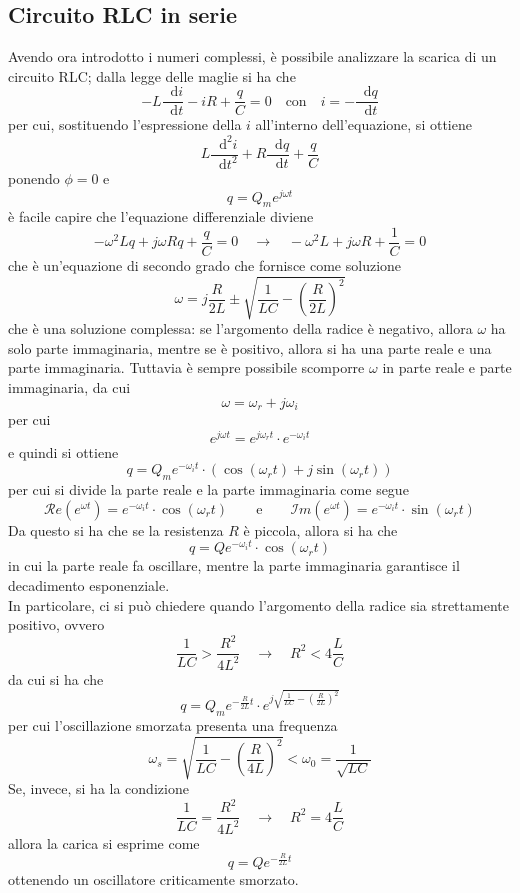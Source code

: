 \documentclass[a4paper]{extarticle}
\newcommand\dif{\mathop{}\!\mathrm{d}}
\begin{document}
\vspace{1em}
\subsection{Circuito RLC in serie}
Avendo ora introdotto i numeri complessi, è possibile analizzare la scarica di un circuito RLC; dalla legge delle maglie si ha che
\[-L \dfrac{\dif i}{\dif t} - i R + \dfrac{q}{C} = 0 \hspace{1em} \text{con} \hspace{1em} i=-\dfrac{\dif q}{\dif t}\]
per cui, sostituendo l'espressione della $i$ all'interno dell'equazione, si ottiene
\[L\dfrac{\dif^2 i}{\dif t^2} + R \dfrac{\dif q}{\dif t} + \dfrac{q}{C}\]
ponendo $\phi=0$ e
\[q=Q_m e^{j \omega t}\]
è facile capire che l'equazione differenziale diviene
\[-\omega^2 L q + j \omega R q + \dfrac{q}{C} = 0 \hspace{1em} \rightarrow \hspace{1em} -\omega^2 L + j\omega R + \dfrac{1}{C} = 0\]
che è un'equazione di secondo grado che fornisce come soluzione
\[\omega=j \dfrac{R}{2L} \pm \sqrt{\dfrac{1}{LC}-\left(\dfrac{R}{2L}\right)^2}\]
che è una soluzione complessa: se l'argomento della radice è negativo, allora $\omega$ ha solo parte immaginaria, mentre se è positivo, allora si ha una parte reale e una parte immaginaria. Tuttavia è sempre possibile scomporre $\omega$ in parte reale e parte immaginaria, da cui
\[\omega=\omega_r + j \omega_i\]
per cui
\[e^{j \omega t} = e^{j \omega_r t} \cdot e^{-\omega_i t}\]
e quindi si ottiene
\[q=Q_m e^{-\omega_i t} \cdot \left(\cos(\omega_r t) + j \sin(\omega_r t)\right)\]
per cui si divide la parte reale e la parte immaginaria come segue
\[\mathcal{R}e\left(e^{\omega t}\right) = e^{-\omega_i t} \cdot \cos(\omega_r t)\hspace{2em} \text{e} \hspace{2em} \mathcal{I}m\left(e^{\omega t}\right) = e^{-\omega_i t} \cdot \sin(\omega_r t)\]
Da questo si ha che se la resistenza $R$ è piccola, allora si ha che
\[q=Qe^{-\omega_i t} \cdot \cos(\omega_r t)\]
in cui la parte reale fa oscillare, mentre la parte immaginaria garantisce il decadimento esponenziale.\\
In particolare, ci si può chiedere quando l'argomento della radice sia strettamente positivo, ovvero
\[\dfrac{1}{LC} > \dfrac{R^2}{4 L^2} \hspace{1em} \rightarrow \hspace{1em} R^2 < 4 \dfrac{L}{C}\]
da cui si ha che
\[q=Q_m e^{-\frac{R}{2L}t} \cdot e^{j \sqrt{\frac{1}{LC} - \left(\frac{R}{2L}\right)^2}}\]
per cui l'oscillazione smorzata presenta una frequenza
\[\omega_s = \sqrt{\frac{1}{LC} - \left(\frac{R}{4 L}\right)^2} < \omega_0 = \frac{1}{\sqrt{LC}}\]
Se, invece, si ha la condizione
\[\dfrac{1}{LC} = \dfrac{R^2}{4 L^2} \hspace{1em} \rightarrow \hspace{1em} R^2 = 4 \dfrac{L}{C}\]
allora la carica si esprime come
\[q=Qe^{-\frac{R}{2L} t}\]
ottenendo un oscillatore criticamente smorzato.
\end{document}
